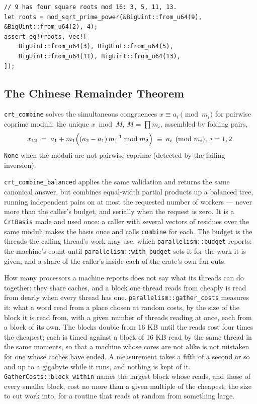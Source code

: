 \documentclass[11pt]{article}
\newcommand{\code}[1]{\texttt{#1}}
\begin{document}
\begin{lstlisting}
// 9 has four square roots mod 16: 3, 5, 11, 13.
let roots = mod_sqrt_prime_power(&BigUint::from_u64(9), &BigUint::from_u64(2), 4);
assert_eq!(roots, vec![
    BigUint::from_u64(3), BigUint::from_u64(5),
    BigUint::from_u64(11), BigUint::from_u64(13),
]);
\end{lstlisting}

\subsection{The Chinese Remainder Theorem}

\code{crt\_combine} solves the simultaneous congruences
$x \equiv a_i \pmod{m_i}$ for pairwise coprime moduli: the unique
$x \bmod M$, $M = \prod m_i$, assembled by folding pairs,
\begin{equation}
x_{12} \;=\; a_1 + m_1\Bigl( (a_2 - a_1)\, m_1^{-1} \bmod m_2 \Bigr)
\;\equiv\; a_i \pmod{m_i},\; i = 1, 2 .
\end{equation}
\code{None} when the moduli are not pairwise coprime (detected by the
failing inversion).

\code{crt\_combine\_balanced} applies the same
validation and returns the same canonical answer, but combines equal-width
partial products up a balanced tree, running independent pairs on at most
the requested number of workers --- never more than the caller's budget,
and serially when the request is zero. It is a \code{CrtBasis} made and
used once: a caller with several vectors of residues over the same moduli
makes the basis once and calls \code{combine} for each. The budget is the
threads the calling thread's work may use, which
\code{parallelism::budget} reports: the machine's count until
\code{parallelism::with\_budget} sets it for the work it is given, and a
share of the caller's inside each of the crate's own fan-outs.

How many processors a machine reports does not say what its threads can do
together: they share caches, and a block one thread reads from cheaply is
read from dearly when every thread has one. \code{parallelism::gather\_costs}
measures it: what a word read from a place chosen at random costs, by the
size of the block it is read from, with a given number of threads reading
at once, each from a block of its own. The blocks double from 16 KB until
the reads cost four times the cheapest; each is timed against a block of
16 KB read by the same thread in the same moments, so that a machine whose
cores are not alike is not mistaken for one whose caches have ended. A
measurement takes a fifth of a second or so and up to a gigabyte while it
runs, and nothing is kept of it. \code{GatherCosts::block\_within} names the
largest block whose reads, and those of every smaller block, cost no more
than a given multiple of the cheapest: the size to cut work into, for a
routine that reads at random from something large.
\end{document}
